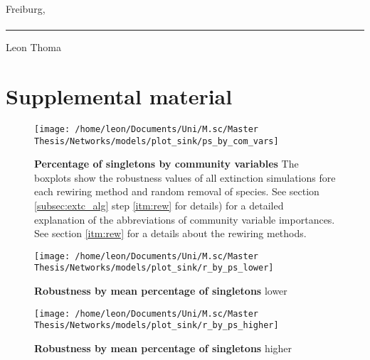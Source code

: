 \documentclass[12pt,a4paper]{article}
\begin{document}
Freiburg,\paragraph{}

\rule{5cm}{.4pt}\par
Leon Thoma
\newpage
\section{Supplemental material}

\begin{figure}[H]
	 \centering
	 \texttt{[image: /home/leon/Documents/Uni/M.sc/Master Thesis/Networks/models/plot\_sink/ps\_by\_com\_vars]}
	 	 \captionsetup{width = .8\textwidth}
	 \caption{\textbf{Percentage of singletons by community variables} The boxplots show the robustness values of all extinction simulations fore each rewiring method and random removal of species. See section \ref{subsec:extc_alg} step \ref{itm:rew} for details) for a detailed explanation of the abbreviations of community variable importances. See section \ref{itm:rew} for a details about the rewiring methods.}
	 \label{fig:ps_by_cv}
\end{figure}

\begin{figure}[H]
	 \centering
	 \texttt{[image: /home/leon/Documents/Uni/M.sc/Master Thesis/Networks/models/plot\_sink/r\_by\_ps\_lower]}
	 \captionsetup{width = .8\textwidth}
	 \caption{\textbf{Robustness by mean percentage of singletons} lower}
	 \label{fig:r_by_ps_lower}
\end{figure}

\begin{figure}[H]
	 \centering
	 \texttt{[image: /home/leon/Documents/Uni/M.sc/Master Thesis/Networks/models/plot\_sink/r\_by\_ps\_higher]}
	 	 \captionsetup{width = .8\textwidth}
	 \caption{\textbf{Robustness by mean percentage of singletons} higher}
	 \label{fig:r_by_ps_higher}
\end{figure}


\end{document}
